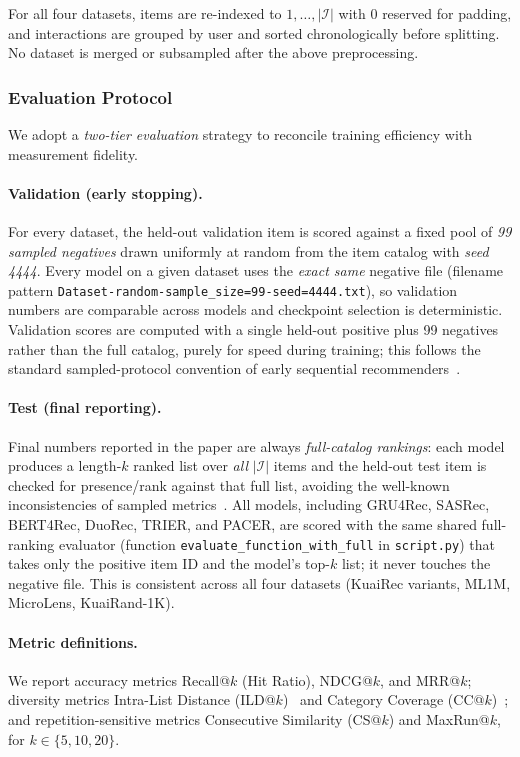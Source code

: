 For all four datasets, items are re-indexed to $1,\ldots,|\mathcal{I}|$ with $0$ reserved for padding, and interactions are grouped by user and sorted chronologically before splitting. No dataset is merged or subsampled after the above preprocessing.

\subsubsection{Evaluation Protocol}
We adopt a \emph{two-tier evaluation} strategy to reconcile training efficiency with measurement fidelity.

\paragraph{Validation (early stopping).}
For every dataset, the held-out validation item is scored against a fixed pool of \emph{99 sampled negatives} drawn uniformly at random from the item catalog with \emph{seed 4444}. Every model on a given dataset uses the \emph{exact same} negative file (filename pattern
\verb|Dataset-random-sample_size=99-seed=4444.txt|), so validation numbers are comparable across models and checkpoint selection is deterministic. Validation scores are computed with a single held-out positive plus 99 negatives rather than the full catalog, purely for speed during training; this follows the standard sampled-protocol convention of early sequential recommenders~\cite{hidasi2016session,kang2018self}.

\paragraph{Test (final reporting).}
Final numbers reported in the paper are always \emph{full-catalog rankings}: each model produces a length-$k$ ranked list over \emph{all} $|\mathcal{I}|$ items and the held-out test item is checked for presence/rank against that full list, avoiding the well-known inconsistencies of sampled metrics~\cite{krichene2020sampled}. All models, including GRU4Rec, SASRec, BERT4Rec, DuoRec, TRIER, and PACER, are scored with the same shared full-ranking evaluator (function \texttt{evaluate\_function\_with\_full} in \texttt{script.py}) that takes only the positive item ID and the model's top-$k$ list; it never touches the negative file. This is consistent across all four datasets (KuaiRec variants, ML1M, MicroLens, KuaiRand-1K).

\paragraph{Metric definitions.}
We report accuracy metrics Recall@$k$ (Hit Ratio), NDCG@$k$, and MRR@$k$; diversity metrics Intra-List Distance (ILD@$k$)~\cite{ziegler2005} and Category Coverage (CC@$k$)~\cite{adomavicius2012}; and repetition-sensitive metrics Consecutive Similarity (CS@$k$) and MaxRun@$k$, for $k\in\{5,10,20\}$.

